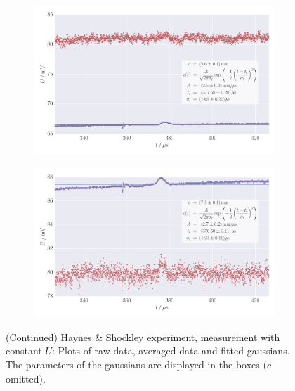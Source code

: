 \begin{figure}
    \centering
    \begin{subfigure}[b]{\pltw}
        \includegraphics[width=1.0\linewidth]{figures/haynes_shockley_raw_17}
        \caption{}
        \label{fig:h_s_raw_17}
    \end{subfigure}
    \begin{subfigure}[b]{\pltw}
        \includegraphics[width=1.0\linewidth]{figures/haynes_shockley_raw_18}
        \caption{}
        \label{fig:h_s_raw_18}
    \end{subfigure}
    \caption{
        (Continued)
        Haynes \& Shockley experiment, measurement with constant $U$:
        Plots of raw data, averaged data and fitted gaussians. 
        The parameters of the gaussians are displayed in the boxes 
        ($c$ omitted).
        }
    \label{fig:h_s_raw_plots_17_18}
\end{figure}
